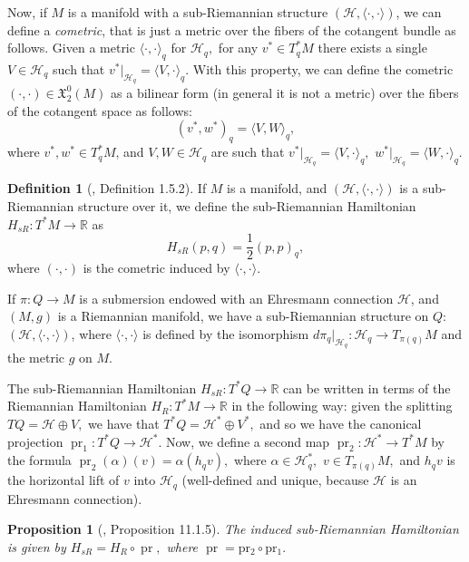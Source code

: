 \documentclass[12pt, letterpaper, reqno]{amsart}
\theoremstyle{definition}
\newtheorem{df}{Definition}
\theoremstyle{plain}
\newtheorem{prop}{Proposition}
\theoremstyle{remark}
\begin{document}
Now, if $ M $ is a manifold with a sub-Riemannian structure $ \left( \mathcal{H}, \langle \cdot,\cdot \rangle \right)  $, we can define a \textit{cometric}, that is just a metric over the fibers of the cotangent bundle as follows. Given a metric $ \langle \cdot,\cdot \rangle_q $ for $ \mathcal{H}_q, $ for any $ v^*\in T^*_qM $ there exists a single $ V\in \mathcal{H}_q $ such that $ v^*|_{\mathcal{H}_q} = \langle V,\cdot \rangle_q $. With this property, we can define the cometric $ (\cdot,\cdot)\in \mathfrak{X}_2^0(M) $ as a bilinear form (in general it is not a metric) over the fibers of the cotangent space as follows:
$$ (v^*,w^*)_q= \langle V,W \rangle_q, $$ 
where $ v^*,w^*\in T^*_qM $, and $ V,W\in \mathcal{H}_q $ are such that $ v^*|_{\mathcal{H}_q}= \langle V,\cdot \rangle_q, $ $ w^*|_{\mathcal{H}_q}= \langle W,\cdot \rangle_q. $ 
\begin{df}[\cite{montgomery2002tour}, Definition 1.5.2]
	If $ M $ is a manifold, and $ \left( \mathcal{H}, \langle\cdot,\cdot\rangle \right) $ is a sub-Riemannian structure over it, we define the sub-Riemannian Hamiltonian $ H_{sR}: T^*M \rightarrow \mathbb{R} $ as $$ H_{sR}(p,q)= \frac{1}{2} (p,p)_q, $$   	
	where $ (\cdot,\cdot) $ is the cometric induced by $ \langle\cdot,\cdot\rangle. $ 
\end{df}
If $ \pi: Q \rightarrow M $ is a submersion endowed with an Ehresmann connection $ \mathcal{H} $, and $ (M,g) $ is a Riemannian manifold, we have a sub-Riemannian structure on $ Q: $ $ (\mathcal{H},\langle\cdot,\cdot\rangle) $, where $ \langle\cdot,\cdot\rangle $ is defined by the isomorphism $ d\pi_q|_{\mathcal{H}_q}: \mathcal{H}_q \rightarrow T_{\pi(q)}M $ and the metric $ g $ on $ M. $ 

The sub-Riemannian Hamiltonian $ H_{sR}: T^*Q \rightarrow \mathbb{R}$ can be written in terms of the Riemannian Hamiltonian $ H_R: T^*M \rightarrow \mathbb{R} $ in the following way: given the splitting $ TQ= \mathcal{H}\oplus V, $ we have that $ T^*Q = \mathcal{H}^* \oplus V^*, $ and so we have the canonical projection $ \operatorname{pr}_1: T^*Q \rightarrow \mathcal{H}^*. $ Now, we define a second map $ \operatorname{pr}_2: \mathcal{H}^* \rightarrow T^*M $ by the formula $ \operatorname{pr}_2(\alpha)(v)=\alpha(h_q v), $ where $ \alpha\in \mathcal{H}^*_q, $ $ v\in T_{\pi(q)}M, $ and $h_qv$ is the horizontal lift of $ v $ into $ \mathcal{H}_q $ (well-defined and unique, because $ \mathcal{H} $ is an Ehresmann connection).
\begin{prop}[\cite{montgomery2002tour}, Proposition 11.1.5]
	The induced sub-Riemannian Hamiltonian is given by $H_{sR}= H_R \circ \operatorname{pr},$ where $ \operatorname{pr}= \operatorname{pr_2}\circ \operatorname{pr_1}. $ 
\end{prop}
\end{document}
